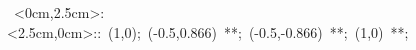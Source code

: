 \hbox{
\xy    <0cm,2.5cm>:<2.5cm,0cm>::
       (1,0); (-0.5,0.866) **\dir{-};
       (-0.5,-0.866) **\dir{-};
       (1,0) **\dir{-};
\endxy}
